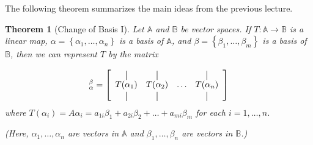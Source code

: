 \documentclass[10pt]{article}
\newtheorem{theorem}{Theorem}
\theoremstyle{definition}
\begin{document}
The following theorem summarizes the main ideas from the previous lecture.

\begin{theorem}[Change of Basis I]
  \label{thm:change-of-basis-I}
  Let $\mathbb{A}$ and $\mathbb{B}$ be vector spaces. If
  $T: \mathbb{A} \to \mathbb{B}$ is a linear map,
  $\alpha= \left\{\alpha_{1},\ldots,\alpha_{n}\right\}$ is a basis of
  $\mathbb{A}$, and $\beta= \left\{\beta_{1},\ldots,\beta_{m}\right\} $ is a
  basis of $\mathbb{B}$, then we can represent $T$ by the matrix
  \newcommand*{\vertbar}{\rule[-1ex]{0.5pt}{2.5ex}}
  \newcommand*{\horzbar}{\,\rule[.5ex]{2.5ex}{0.5pt}\,}

  \begin{equation*}
    [T]_{\alpha}^{\beta}
       = 
      \left[
        \begin{array}{cccc}
          \vertbar & \vertbar &        & \vertbar \\
          T(\alpha_{1})    & T(\alpha_{2})    & \ldots & T(\alpha_{n})    \\
          \vertbar & \vertbar &        & \vertbar 
        \end{array}
      \right]
    \end{equation*}
    where
    $T(\alpha_{i}) = A\alpha_{i} =
    a_{1i}\beta_{1}+a_{2i}\beta_{2}+\ldots+a_{mi}\beta_{m}$ for each
    $i=1,\ldots,n$.

    (Here, $\alpha_{1},\ldots,\alpha_{n}$ are vectors in $\mathbb{A}$ and
    $\beta_{1},\ldots,\beta_{n}$ are vectors in $\mathbb{B}$.)
\end{theorem}
\end{document}
